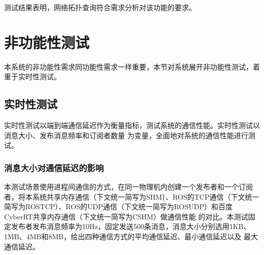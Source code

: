 测试结果表明，网络拓扑查询符合需求分析对该功能的要求。

\section{非功能性测试}
本系统的非功能性需求同功能性需求一样重要，本节对系统展开非功能性测试，着重于实时性测试。

\subsection{实时性测试}
实时性测试以端到端通信延迟作为衡量指标，测试系统的通信性能。实时性测试以消息大小、发布消息频率和订阅者数量
为变量，全面地对系统的通信性能进行测试。
\subsubsection{消息大小对通信延迟的影响}
本测试场景使用进程间通信的方式，在同一物理机内创建一个发布者和一个订阅者，将本系统共享内存通信（下文统一简写为SHM）、ROS的TCP通信（下文统一简写为ROSTCP）、ROS的UDP通信（下文统一简写为ROSUDP）和百度CyberRT共享内存通信（下文统一简写为CSHM）做通信性能
的对比。本测试固定发布者发布消息频率为10Hz，固定发送500条消息，消息大小分别选用1KB、1MB、4MB和8MB，给出四种通信方式的平均通信延迟、最小通信延迟以及
最大通信延迟。


